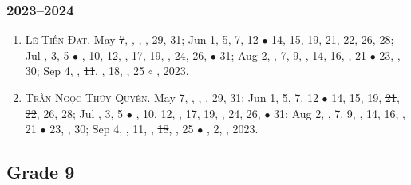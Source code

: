 \documentclass{article}
\begin{document}
\subsubsection{2023--2024}

\begin{enumerate}
	\item \textsc{Lê Tiến Đạt.} May \st{7}, , , , 29, 31; Jun 1, 5, 7, 12 $\bullet$ 14, 15, 19, 21, 22, 26, 28; Jul , 3, 5 $\bullet$ , 10, 12, , 17, 19, , 24, 26,  $\bullet$ 31; Aug 2, , 7, 9, , 14, 16, , 21 $\bullet$ 23, , 30; Sep 4, , \st{11}, , 18, , 25 $\circ$ , 2023. {\sf[Out]}
	\item \textsc{Trần Ngọc Thúy Quyên.} May 7, , , , 29, 31; Jun 1, 5, 7, 12 $\bullet$ 14, 15, 19, \st{21}, \st{22}, 26, 28; Jul , 3, 5 $\bullet$ , 10, 12, , 17, 19, , 24, 26,  $\bullet$ 31; Aug 2, , 7, 9, , 14, 16, , 21 $\bullet$ 23, , 30; Sep 4, , 11, , \st{18}, , 25 $\bullet$ , 2, , 2023.
\end{enumerate}


\subsection{Grade 9}
\end{document}
